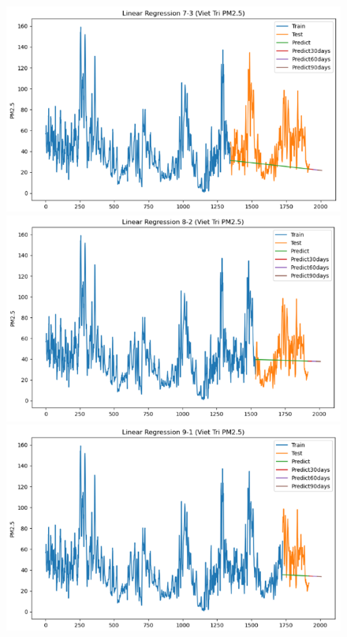 \begin{figure}[H]
{\begin{adjustbox}{minipage=0.475\textwidth}
            \begin{minipage}{0.3\textwidth}
                \centering
                \includegraphics[width=\textwidth, height=0.5\textwidth]{img/final/Linear Regression/90D/LN_7_3_VT.png}\\
                \includegraphics[width=\textwidth, height=0.5\textwidth]{img/final/Linear Regression/90D/LN_8_2_VT.png}\\
                \includegraphics[width=\textwidth]{img/final/Linear Regression/90D/LN_9_1_VT.png}

\end{minipage}
\end{adjustbox}}
\end{figure}
